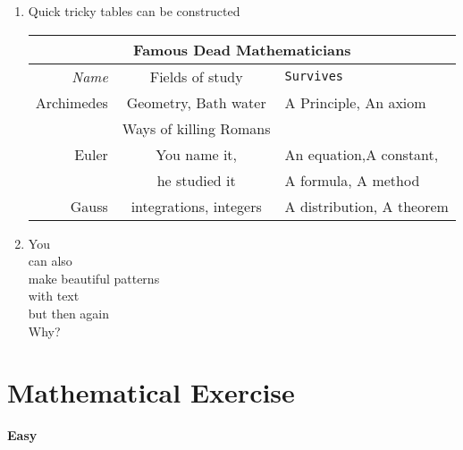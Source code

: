 \documentclass[11pt]{article}
\begin{document}
	\begin{enumerate}
		\item Quick tricky tables can be constructed\\
		\begin{tabular}{|r|c|l|}
			\hline
			\multicolumn{3}{|c|}{\textbf{Famous Dead Mathematicians}}\\
			\hline
			\textit{Name} &\textsf{Fields of study}&\texttt{Survives}\\
			\hline
			Archimedes&Geometry, Bath water & A Principle, An axiom\\
			&Ways of killing Romans &\\
			\hline
			Euler&You name it,&An equation,A constant,\\
			&he studied it&A formula, A method\\
			\hline
			\huge Gauss&\normalsize integrations, integers& A distribution, A theorem\\
			\hline
		\end{tabular}
		
		\item You\vspace*{-0.2 cm}\\
		\hspace*{1 cm}can also\vspace*{-0.2 cm}\\
		\hspace*{2.5 cm}make beautiful patterns\vspace*{-0.2 cm}\\
		\hspace*{3.5 cm}with text\vspace*{-0.2 cm}\\
		\hspace*{2.5 cm}but then again\\
		\hspace*{1 cm} \huge Why?\\
	\end{enumerate}
	
	
	
	\section*{Mathematical Exercise}
	\large \textbf{Easy}
	
\end{document}
